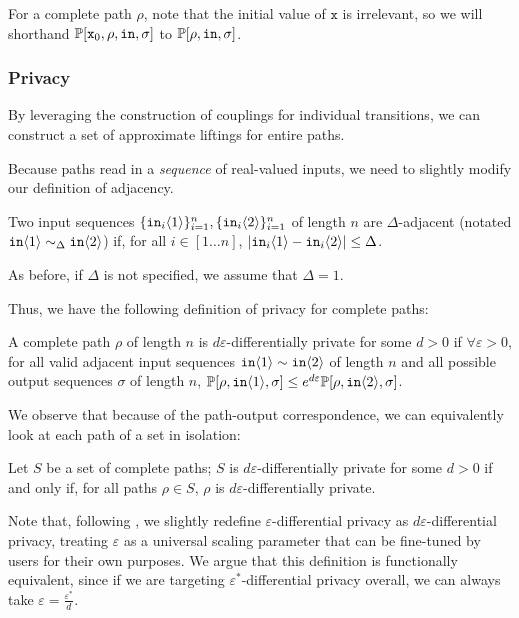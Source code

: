 For a complete path $\rho$, note that the initial value of $\texttt{x}$ is irrelevant, so we will shorthand $\mathbb{P}[\texttt{x}_0, \rho, \texttt{in}, \sigma]$ to $\mathbb{P}[\rho, \texttt{in}, \sigma]$.


\subsubsection{Privacy}

By leveraging the construction of couplings for individual transitions, we can construct a set of approximate liftings for entire paths.

Because paths read in a \textit{sequence} of real-valued inputs, we need to slightly modify our definition of adjacency.

\begin{defn}
    Two input sequences $\{\texttt{in}_i\langle1 \rangle\}_{i=1}^n, \{\texttt{in}_i\langle2 \rangle\}_{i=1}^n$ of length $n$ are $\Delta$-adjacent (notated $\texttt{in}\langle1 \rangle \sim_{\Delta}\texttt{in}\langle2 \rangle$) if, for all $i\in [1\ldots n]$, $|\texttt{in}_i\langle1 \rangle-\texttt{in}_i\langle2 \rangle|\leq \Delta$. 

    As before, if $\Delta$ is not specified, we assume that $\Delta = 1$. 
\end{defn}

Thus, we have the following definition of privacy for complete paths:

\begin{defn}
    A complete path $\rho$ of length $n$ is $d\varepsilon$-differentially private for some $d>0$ if $\forall \varepsilon>0$, for all valid adjacent input sequences $\texttt{in}\langle1 \rangle\sim \texttt{in}\langle2 \rangle$ of length $n$ and all possible output sequences $\sigma$ of length $n$, $\mathbb{P}[\rho, \texttt{in}\langle1 \rangle, \sigma]\leq e^{d\varepsilon}\mathbb{P}[\rho, \texttt{in}\langle2 \rangle, \sigma]$.
\end{defn}

We observe that because of the path-output correspondence, we can equivalently look at each path of a set in isolation:
\begin{prop}
    Let $S$ be a set of complete paths; $S$ is $d\varepsilon$-differentially private for some $d>0$ if and only if, for all paths $\rho\in S$, $\rho$ is $d\varepsilon$-differentially private.
\end{prop}

Note that, following \cite{chadhaLinearTimeDecidability2021}, we slightly redefine $\varepsilon$-differential privacy as $d\varepsilon$-differential privacy, treating $\varepsilon$ as a universal scaling parameter that can be fine-tuned by users for their own purposes. 
We argue that this definition is functionally equivalent, since if we are targeting $\varepsilon^*$-differential privacy overall, we can always take $\varepsilon = \frac{\varepsilon^*}{d}$.

